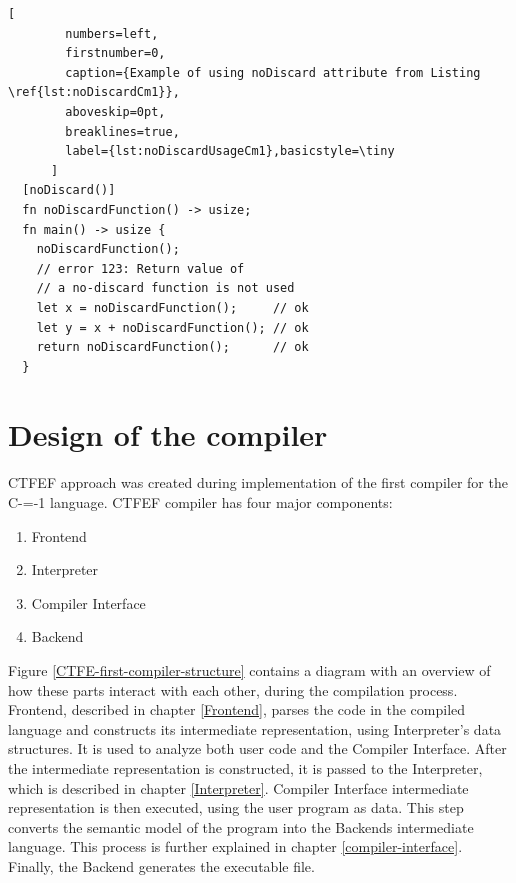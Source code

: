 \begin{minipage}{\linewidth}

	\begin{lstlisting}[
		numbers=left,
		firstnumber=0,
		caption={Example of using noDiscard attribute from Listing \ref{lst:noDiscardCm1}},
		aboveskip=0pt,
		breaklines=true,
		label={lst:noDiscardUsageCm1},basicstyle=\tiny
	  ]
  [noDiscard()]
  fn noDiscardFunction() -> usize;
  fn main() -> usize {
	noDiscardFunction();
	// error 123: Return value of
	// a no-discard function is not used
	let x = noDiscardFunction();     // ok
	let y = x + noDiscardFunction(); // ok
	return noDiscardFunction();      // ok
  }
  \end{lstlisting}
\end{minipage}

\section{Design of the compiler}
\label{compiler-design}

CTFEF approach was created during implementation of the first compiler for the C-=-1 language\cite{grabski2022compilation}.
CTFEF compiler has four major components:
\begin{enumerate}
	\item Frontend
	\item Interpreter
	\item Compiler Interface
	\item Backend
\end{enumerate}

Figure \ref{CTFE-first-compiler-structure} contains a diagram with an overview of how these parts interact with each other, during the compilation process.
Frontend, described in chapter \ref{Frontend}, parses the code in the compiled language and constructs its intermediate representation, using Interpreter's data structures.
It is used to analyze both user code and the Compiler Interface.
After the intermediate representation is constructed, it is passed to the Interpreter, which is described in chapter \ref{Interpreter}.
Compiler Interface intermediate representation is then executed, using the user program as data.
This step converts the semantic model of the program into the Backends intermediate language.
This process is further explained in chapter \ref{compiler-interface}.
Finally, the Backend generates the executable file.

